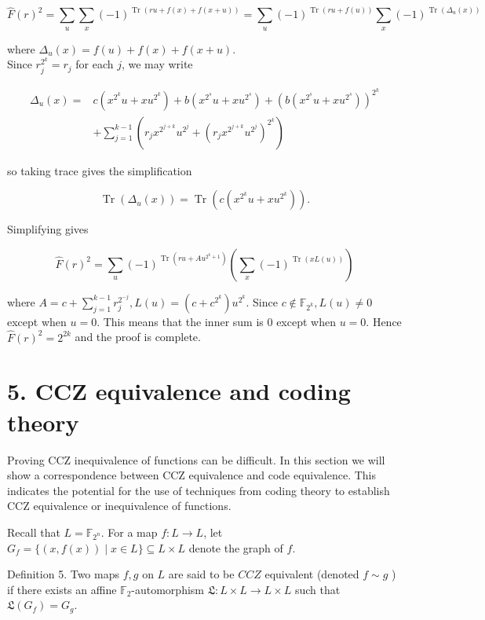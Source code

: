 \documentclass[10pt]{article}
\begin{document}
$$
\widehat{F}(r)^{2}=\sum_{u} \sum_{x}(-1)^{\operatorname{Tr}(r u+f(x)+f(x+u))}=\sum_{u}(-1)^{\operatorname{Tr}(r u+f(u))} \sum_{x}(-1)^{\operatorname{Tr}\left(\Delta_{u}(x)\right)}
$$

where $\Delta_{u}(x)=f(u)+f(x)+f(x+u)$.\\
Since $r_{j}^{2^{k}}=r_{j}$ for each $j$, we may write

$$
\begin{aligned}
\Delta_{u}(x)= & c\left(x^{2^{k}} u+x u^{2^{k}}\right)+b\left(x^{2^{s}} u+x u^{2^{s}}\right)+\left(b\left(x^{2^{s}} u+x u^{2^{s}}\right)\right)^{2^{k}} \\
& +\sum_{j=1}^{k-1}\left(r_{j} x^{2^{j+k}} u^{2^{j}}+\left(r_{j} x^{2^{j+k}} u^{2^{j}}\right)^{2^{k}}\right)
\end{aligned}
$$

so taking trace gives the simplification

$$
\operatorname{Tr}\left(\Delta_{u}(x)\right)=\operatorname{Tr}\left(c\left(x^{2^{k}} u+x u^{2^{k}}\right)\right) .
$$

Simplifying gives

$$
\widehat{F}(r)^{2}=\sum_{u}(-1)^{\operatorname{Tr}\left(r u+A u^{2^{k}+1}\right)}\left(\sum_{x}(-1)^{\operatorname{Tr}(x L(u))}\right)
$$

where $A=c+\sum_{j=1}^{k-1} r_{j}^{2^{-j}}, L(u)=\left(c+c^{2^{k}}\right) u^{2^{k}}$. Since $c \notin \mathbb{F}_{2^{k}}, L(u) \neq 0$ except when $u=0$. This means that the inner sum is 0 except when $u=0$. Hence $\widehat{F}(r)^{2}=2^{2 k}$ and the proof is complete.

\section*{5. CCZ equivalence and coding theory}
Proving CCZ inequivalence of functions can be difficult. In this section we will show a correspondence between CCZ equivalence and code equivalence. This indicates the potential for the use of techniques from coding theory to establish CCZ equivalence or inequivalence of functions.

Recall that $L=\mathbb{F}_{2^{n}}$. For a map $f: L \rightarrow L$, let $G_{f}=\{(x, f(x)) \mid x \in L\} \subseteq L \times L$ denote the graph of $f$.

Definition 5. Two maps $f, g$ on $L$ are said to be $C C Z$ equivalent (denoted $f \sim g$ ) if there exists an affine $\mathbb{F}_{2}$-automorphism $\mathfrak{L}: L \times L \rightarrow L \times L$ such that $\mathfrak{L}\left(G_{f}\right)=G_{g}$.
\end{document}
